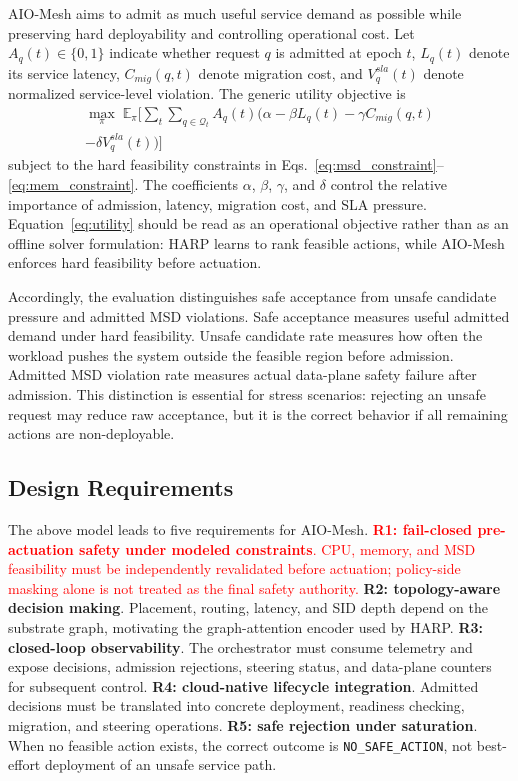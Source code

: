\documentclass[final,5p]{elsarticle}
\newcommand{\rev}[1]{\textcolor{red}{#1}}
\begin{document}
AIO-Mesh aims to admit as much useful service demand as possible while preserving hard deployability and controlling operational cost. Let \(A_q(t)\in\{0,1\}\) indicate whether request \(q\) is admitted at epoch \(t\), \(L_q(t)\) denote its service latency, \(C_{mig}(q,t)\) denote migration cost, and \(V_q^{sla}(t)\) denote normalized service-level violation. The generic utility objective is
\begin{equation}
\begin{aligned}
\max_{\pi} \;
\mathbb{E}_{\pi} \Bigg[
\sum_{t} \sum_{q \in \mathcal{Q}_t}
A_q(t) \Big(
\alpha - \beta L_q(t) - \gamma C_{mig}(q,t) \\
- \delta V_q^{sla}(t)
\Big)
\Bigg]
\end{aligned}
\label{eq:utility}
\end{equation}
subject to the hard feasibility constraints in
Eqs.~\eqref{eq:msd_constraint}--\eqref{eq:mem_constraint}. The coefficients \(\alpha\), \(\beta\), \(\gamma\), and \(\delta\) control the relative importance of admission, latency, migration cost, and SLA pressure. Equation~\eqref{eq:utility} should be read as an operational objective rather than as an offline solver formulation: HARP learns to rank feasible actions, while AIO-Mesh enforces hard feasibility before actuation.

Accordingly, the evaluation distinguishes safe acceptance from unsafe candidate pressure and admitted MSD violations. Safe acceptance measures useful admitted demand under hard feasibility. Unsafe candidate rate measures how often the workload pushes the system outside the feasible region before admission. Admitted MSD violation rate measures actual data-plane safety failure after admission. This distinction is essential for stress scenarios: rejecting an unsafe request may reduce raw acceptance, but it is the correct behavior if all remaining actions are non-deployable.

\subsection{Design Requirements}
\label{subsec:design_requirements}

The above model leads to five requirements for AIO-Mesh. \rev{\textbf{R1: fail-closed pre-actuation safety under modeled constraints}. CPU, memory, and MSD feasibility must be independently revalidated before actuation; policy-side masking alone is not treated as the final safety authority.} \textbf{R2: topology-aware decision making}. Placement, routing, latency, and SID depth depend on the substrate graph, motivating the graph-attention encoder used by HARP. \textbf{R3: closed-loop observability}. The orchestrator must consume telemetry and expose decisions, admission rejections, steering status, and data-plane counters for subsequent control. \textbf{R4: cloud-native lifecycle integration}. Admitted decisions must be translated into concrete deployment, readiness checking, migration, and steering operations. \textbf{R5: safe rejection under saturation}. When no feasible action exists, the correct outcome is \texttt{NO\_SAFE\_ACTION}, not best-effort deployment of an unsafe service path.
\end{document}
